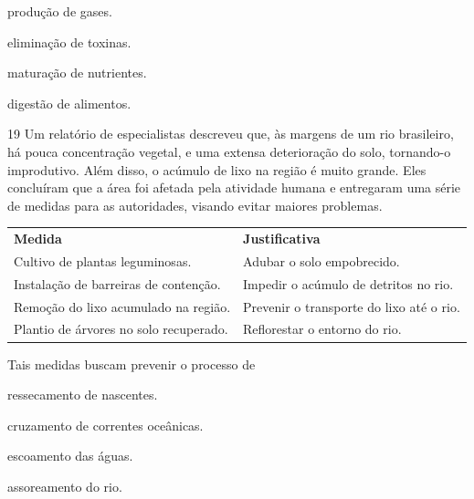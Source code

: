 \begin{minipage}{.5\textwidth}
\begin{escolha}
\item produção de gases.

\item eliminação de toxinas.

\item maturação de nutrientes.

\item digestão de alimentos.
\end{escolha}
\end{minipage}

\num{19} Um relatório de especialistas descreveu que, às margens de
um rio brasileiro, há pouca concentração vegetal, e uma extensa
deterioração do solo, tornando-o improdutivo. Além disso, o acúmulo de
lixo na região é muito grande. Eles concluíram que a área foi afetada
pela atividade humana e entregaram uma série de medidas para as
autoridades, visando evitar maiores problemas.

\begin{longtable}[]{@{}ll@{}}
\toprule
\textbf{Medida} & \textbf{Justificativa}\tabularnewline
Cultivo de plantas leguminosas. & Adubar o solo
empobrecido.\tabularnewline
Instalação de barreiras de contenção. & Impedir o acúmulo de detritos no
rio.\tabularnewline
Remoção do lixo acumulado na região. & Prevenir o transporte do lixo até
o rio.\tabularnewline
Plantio de árvores no solo recuperado. & Reflorestar o entorno do
rio.\tabularnewline
\bottomrule
\end{longtable}

Tais medidas buscam prevenir o processo de

\begin{minipage}{.5\textwidth}
\begin{escolha}
\item ressecamento de nascentes.

\item cruzamento de correntes oceânicas.

\item escoamento das águas.

\item assoreamento do rio.
\end{escolha}
\end{minipage}

